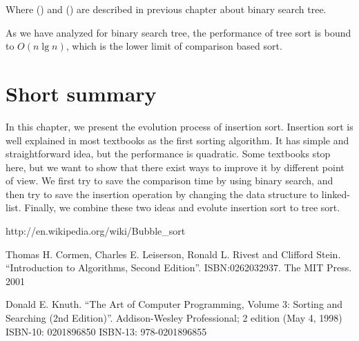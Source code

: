 \documentclass[UTF8]{article}
\begin{document}
Where () and () are described in
previous chapter about binary search tree.

As we have analyzed for binary search tree, the performance of tree sort
is bound to $O(n \lg n)$, which is the lower limit of comparison based
sort\cite{Knuth}.

\section{Short summary}
In this chapter, we present the evolution process of insertion sort. Insertion
sort is well explained in most textbooks as the first sorting algorithm.
It has simple and straightforward idea, but the performance is quadratic.
Some textbooks stop here, but we want to show that there exist ways to improve
it by different point of view. We first try to save the comparison time
by using binary search, and then try to save the insertion operation by
changing the data structure to linked-list. Finally, we combine these
two ideas and evolute insertion sort to tree sort.

\begin{thebibliography}{99}

http://en.wikipedia.org/wiki/Bubble\_sort

Thomas H. Cormen, Charles E. Leiserson, Ronald L. Rivest and Clifford Stein.
``Introduction to Algorithms, Second Edition''. ISBN:0262032937. The MIT Press. 2001

Donald E. Knuth. ``The Art of Computer Programming, Volume 3: Sorting and Searching (2nd Edition)''. Addison-Wesley Professional; 2 edition (May 4, 1998) ISBN-10: 0201896850 ISBN-13: 978-0201896855

\end{thebibliography}

\ifx\wholebook\relax\else
\end{document}

